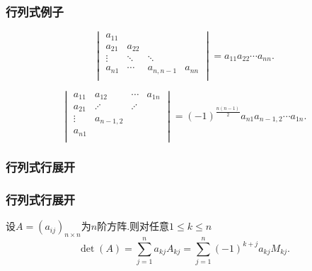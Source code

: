 \begin{frame}\frametitle{行列式例子}
\begin{example}
\[\begin{vmatrix}
a_{11}&&&\\
 a_{21} &a_{22}&&\\
 \vdots &    \ddots  &\ddots&\\
  a_{n1}&    \cdots   & a_{n,n-1}    &a_{nn}\\
\end{vmatrix}=a_{11}a_{22}\cdots a_{nn}.\]
\end{example}
\pp

\begin{example}
\[\begin{vmatrix}
a_{11}&a_{12}&\cdots&a_{1n}\\
a_{21}& \iddots &\iddots&\\
\vdots&a_{n-1,2}& & \\
a_{n1}& & &\\
\end{vmatrix}=(-1)^{\frac{n(n-1)}{2}}a_{n1}a_{n-1,2}\cdots a_{1n}.\]
\end{example}
\end{frame}

\subsubsection{行列式行展开}
\begin{frame}\frametitle{行列式行展开}
\begin{theorem}[行列式行展开]
设$A=(a_{ij})_{n\times n}$为$n$阶方阵.则对任意$1\leq k \leq n$
\[\boxed{\det(A)=\sum_{j=1}^na_{kj}A_{kj} = \sum_{j=1}^{n}(-1)^{k+j}a_{kj}M_{kj}.}\]
\end{theorem}
\pp
\bigskip

\end{frame}




